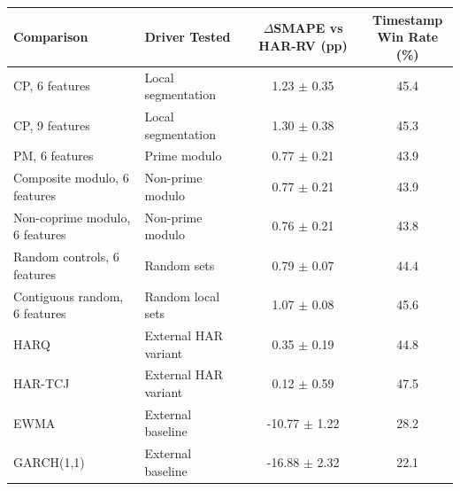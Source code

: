 \begin{tabular}{|l|l|c|c|}
\hline
Comparison & Driver Tested & \shortstack{$\Delta$SMAPE\\vs HAR-RV (pp)} & \shortstack{Timestamp\\Win Rate (\%)} \\
\hline
CP, 6 features & Local segmentation & 1.23 $\pm$ 0.35 & 45.4 \\
CP, 9 features & Local segmentation & 1.30 $\pm$ 0.38 & 45.3 \\
PM, 6 features & Prime modulo & 0.77 $\pm$ 0.21 & 43.9 \\
Composite modulo, 6 features & Non-prime modulo & 0.77 $\pm$ 0.21 & 43.9 \\
Non-coprime modulo, 6 features & Non-prime modulo & 0.76 $\pm$ 0.21 & 43.8 \\
Random controls, 6 features & Random sets & 0.79 $\pm$ 0.07 & 44.4 \\
Contiguous random, 6 features & Random local sets & 1.07 $\pm$ 0.08 & 45.6 \\
HARQ & External HAR variant & 0.35 $\pm$ 0.19 & 44.8 \\
HAR-TCJ & External HAR variant & 0.12 $\pm$ 0.59 & 47.5 \\
EWMA & External baseline & -10.77 $\pm$ 1.22 & 28.2 \\
GARCH(1,1) & External baseline & -16.88 $\pm$ 2.32 & 22.1 \\
\hline
\end{tabular}